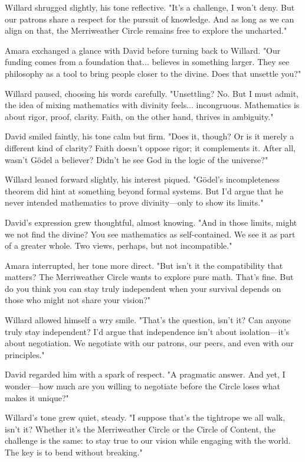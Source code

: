 Willard shrugged slightly, his tone reflective. "It’s a challenge, I won’t deny. But our patrons share a respect for the pursuit of knowledge. And as long as we can align on that, the Merriweather Circle remains free to explore the uncharted."
\smallskip

Amara exchanged a glance with David before turning back to Willard. "Our funding comes from a foundation that... believes in something larger. They see philosophy as a tool to bring people closer to the divine. Does that unsettle you?"
\smallskip

Willard paused, choosing his words carefully. "Unsettling? No. But I must admit, the idea of mixing mathematics with divinity feels... incongruous. Mathematics is about rigor, proof, clarity. Faith, on the other hand, thrives in ambiguity."
\smallskip

David smiled faintly, his tone calm but firm. "Does it, though? Or is it merely a different kind of clarity? Faith doesn’t oppose rigor; it complements it. After all, wasn’t Gödel a believer? Didn’t he see God in the logic of the universe?"
\smallskip

Willard leaned forward slightly, his interest piqued. "Gödel’s incompleteness theorem did hint at something beyond formal systems. But I’d argue that he never intended mathematics to prove divinity—only to show its limits."
\smallskip

David’s expression grew thoughtful, almost knowing. "And in those limits, might we not find the divine? You see mathematics as self-contained. We see it as part of a greater whole. Two views, perhaps, but not incompatible."
\smallskip

Amara interrupted, her tone more direct. "But isn’t it the compatibility that matters? The Merriweather Circle wants to explore pure math. That’s fine. But do you think you can stay truly independent when your survival depends on those who might not share your vision?"
\smallskip

Willard allowed himself a wry smile. "That’s the question, isn’t it? Can anyone truly stay independent? I’d argue that independence isn’t about isolation—it’s about negotiation. We negotiate with our patrons, our peers, and even with our principles."
\smallskip

David regarded him with a spark of respect. "A pragmatic answer. And yet, I wonder—how much are you willing to negotiate before the Circle loses what makes it unique?"
\smallskip

Willard’s tone grew quiet, steady. "I suppose that’s the tightrope we all walk, isn’t it? Whether it’s the Merriweather Circle or the Circle of Content, the challenge is the same: to stay true to our vision while engaging with the world. The key is to bend without breaking."
\smallskip

